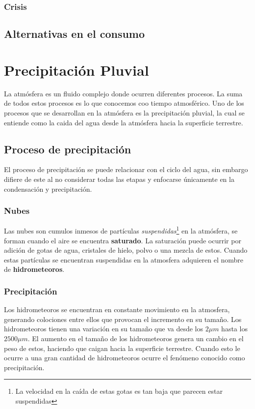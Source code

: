 \documentclass[letterpaper,12pt,oneside]{book}
\begin{document}
        \subsection{Crisis}
    \section{Alternativas en el consumo}

\chapter{Precipitación Pluvial} 
    La atmósfera es un fluido complejo donde ocurren diferentes procesos. La suma de todos estos procesos es lo que conocemos coo tiempo atmosférico. Uno de los procesos que se desarrollan en la atmósfera es la precipitación pluvial, la cual se entiende como la caida del agua desde la atmósfera hacia la superficie terrestre.

    \section{Proceso de precipitación}
        El proceso de precipitación se puede relacionar con el ciclo del agua, sin embargo difiere de este al no considerar todas las etapas y enfocarse únicamente en la condensación y precipitación.
        \subsection{Nubes}
            Las nubes son cumulos inmesos de partículas \textit{suspendidas}\footnote{La velocidad en la caída de estas gotas es tan baja que parecen estar suspendidas} en la atmósfera, se forman cuando el aire se encuentra \textbf{saturado}. La saturación puede ocurrir por adición de gotas de agua, cristales de hielo, polvo o una mezcla de estos. 
            Cuando estas partículas se encuentran suspendidas en la atmosfera adquieren el nombre de \textbf{hidrometeoros}.
        \subsection{Precipitación}
            Los hidrometeoros se encuentran en constante movimiento en la atmosfera, generando colociones entre ellos que provocan el incremento en su tamaño. Los hidrometeoros tienen una variación en su tamaño que va desde los $2\mu m$ hasta los $2500 \mu m$. El aumento en el tamaño de los hidrometeoros genera un cambio en el peso de estos, haciendo que caigan hacia la superficie terrestre. Cuando esto le ocurre a una gran cantidad de hidrometeoros ocurre el fenómeno conocido como precipitación.
\end{document}
